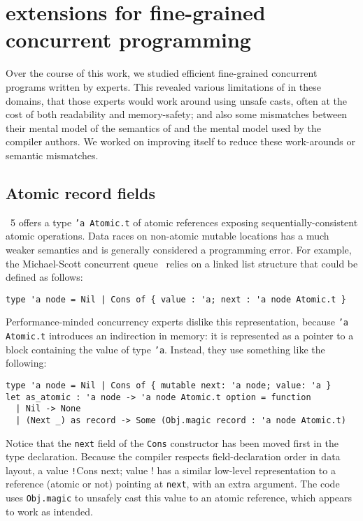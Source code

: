 \section{\OCaml extensions for fine-grained concurrent programming}
\label{sec:ocaml}

Over the course of this work, we studied efficient fine-grained concurrent \OCaml programs written by experts.
This revealed various limitations of \OCaml in these domains, that those experts would work around using unsafe casts, often at the cost of both readability and memory-safety; and also some mismatches between their mental model of the semantics of \OCaml and the mental model used by the \OCaml compiler authors.
We worked on improving \OCaml itself to reduce these work-arounds or semantic mismatches.

\subsection{Atomic record fields}
\label{sec:atomic-record-fields}

\OCaml~5 offers a type \texttt{'a Atomic.t} of atomic references exposing sequentially-consistent atomic operations.
Data races on non-atomic mutable locations has a much weaker semantics and is generally considered a programming error.
For example, the Michael-Scott concurrent queue~\cite{DBLP:conf/podc/MichaelS96} relies on a linked list structure that could be defined as follows:

\begin{verbatim}
type 'a node = Nil | Cons of { value : 'a; next : 'a node Atomic.t }
\end{verbatim}

Performance-minded concurrency experts dislike this representation, because \texttt{'a Atomic.t} introduces an indirection in memory: it is represented as a pointer to a block containing the value of type \texttt{'a}.
Instead, they use something like the following:

\begin{verbatim}
type 'a node = Nil | Cons of { mutable next: 'a node; value: 'a }
let as_atomic : 'a node -> 'a node Atomic.t option = function
  | Nil -> None
  | (Next _) as record -> Some (Obj.magic record : 'a node Atomic.t)
\end{verbatim}

Notice that the \texttt{next} field of the \texttt{Cons} constructor has been moved first in the type declaration.
Because the \OCaml compiler respects field-declaration order in data layout, a value \texttt!Cons { next; value }! has a similar low-level representation to a reference (atomic or not) pointing at \texttt{next}, with an extra argument.
The code uses \texttt{Obj.magic} to unsafely cast this value to an atomic reference, which appears to work as intended.

